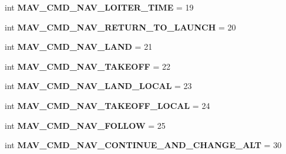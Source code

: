 \begin{DoxyCompactItemize}
\item 
\mbox{\label{namespacepymavlink_1_1dialects_1_1v10_a7dbf3496cc2956a0ea4b93c0700d5a3a}} 
int {\bfseries M\+A\+V\+\_\+\+C\+M\+D\+\_\+\+N\+A\+V\+\_\+\+L\+O\+I\+T\+E\+R\+\_\+\+T\+I\+ME} = 19
\item 
\mbox{\label{namespacepymavlink_1_1dialects_1_1v10_ae4875b80456c6b66f2a99ff1e2e83e03}} 
int {\bfseries M\+A\+V\+\_\+\+C\+M\+D\+\_\+\+N\+A\+V\+\_\+\+R\+E\+T\+U\+R\+N\+\_\+\+T\+O\+\_\+\+L\+A\+U\+N\+CH} = 20
\item 
\mbox{\label{namespacepymavlink_1_1dialects_1_1v10_a5a1e51b67265dc21522c30c75ab5953c}} 
int {\bfseries M\+A\+V\+\_\+\+C\+M\+D\+\_\+\+N\+A\+V\+\_\+\+L\+A\+ND} = 21
\item 
\mbox{\label{namespacepymavlink_1_1dialects_1_1v10_a09886ca5c2401d8d76eb70a31bcc5f99}} 
int {\bfseries M\+A\+V\+\_\+\+C\+M\+D\+\_\+\+N\+A\+V\+\_\+\+T\+A\+K\+E\+O\+FF} = 22
\item 
\mbox{\label{namespacepymavlink_1_1dialects_1_1v10_a54fc409b3f084505f2deb441871f9fee}} 
int {\bfseries M\+A\+V\+\_\+\+C\+M\+D\+\_\+\+N\+A\+V\+\_\+\+L\+A\+N\+D\+\_\+\+L\+O\+C\+AL} = 23
\item 
\mbox{\label{namespacepymavlink_1_1dialects_1_1v10_a1c513d4325402dfa6cb3c0587adbbbd8}} 
int {\bfseries M\+A\+V\+\_\+\+C\+M\+D\+\_\+\+N\+A\+V\+\_\+\+T\+A\+K\+E\+O\+F\+F\+\_\+\+L\+O\+C\+AL} = 24
\item 
\mbox{\label{namespacepymavlink_1_1dialects_1_1v10_a4fb2d85bedfbfe24a3d4d2f15348b746}} 
int {\bfseries M\+A\+V\+\_\+\+C\+M\+D\+\_\+\+N\+A\+V\+\_\+\+F\+O\+L\+L\+OW} = 25
\item 
\mbox{\label{namespacepymavlink_1_1dialects_1_1v10_a948a3b0b4b0e9bec86657bd446a997a1}} 
int {\bfseries M\+A\+V\+\_\+\+C\+M\+D\+\_\+\+N\+A\+V\+\_\+\+C\+O\+N\+T\+I\+N\+U\+E\+\_\+\+A\+N\+D\+\_\+\+C\+H\+A\+N\+G\+E\+\_\+\+A\+LT} = 30
\item 

\end{DoxyCompactItemize}
